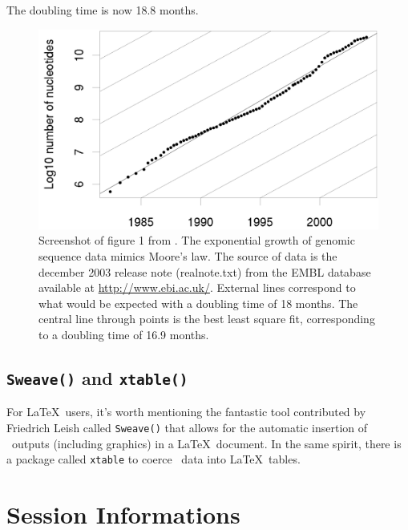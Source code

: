 \documentclass{article}
\begin{document}
The doubling time is now 18.8 months.


\begin{figure}
\begin{center}
\includegraphics[width=\textwidth]{../figs/fig1lncs2004}
\end{center}
\caption{Screenshot of figure 1 from \cite{lobrylncs}.
The exponential growth of genomic sequence data mimics Moore's law.
The source of data is the december 2003 release note (realnote.txt) from the EMBL database
available at \protect\url{http://www.ebi.ac.uk/}. External lines correspond to what would be expected with
a doubling time of 18 months. The central line through points is the best least square fit,
corresponding to a doubling time of 16.9 months.}
\label{fig1lncs2004}
\end{figure}

\subsection{\texttt{Sweave()} and \texttt{xtable()}}

For \LaTeX~users, it's
worth mentioning the fantastic tool contributed by Friedrich Leish \cite{Sweave}
called \texttt{Sweave()} that allows for the automatic insertion
of \Rlogo{}~outputs (including graphics) in a \LaTeX~document. In the same spirit, there
is a package called \texttt{xtable} \cite{xtable} to coerce \Rlogo{}~data into \LaTeX~tables.


\section*{Session Informations}
\end{document}
